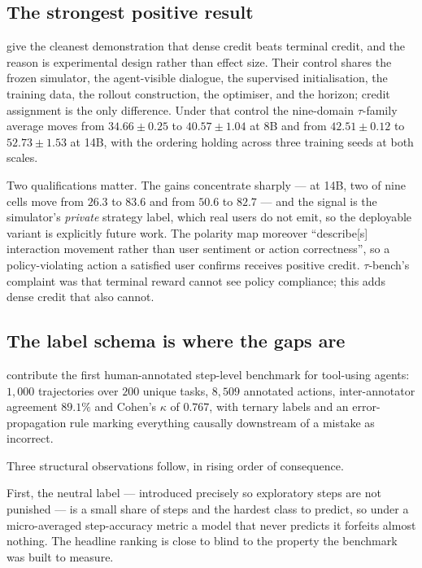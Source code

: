 \documentclass[10pt,twocolumn,a4paper]{article}
\begin{document}
\subsection{The strongest positive result}

\citet{zhao2026betteragentsmultiturnuser} give the cleanest demonstration that dense credit
beats terminal credit, and the reason is experimental design rather than effect size.
Their control shares the frozen simulator, the agent-visible dialogue, the supervised
initialisation, the training data, the rollout construction, the optimiser, and the
horizon; credit assignment is the only difference.
Under that control the nine-domain $\tau$-family average moves from
$34.66 \pm 0.25$ to $40.57 \pm 1.04$ at 8B and from $42.51 \pm 0.12$ to
$52.73 \pm 1.53$ at 14B, with the ordering holding across three training seeds at both
scales.

Two qualifications matter.
The gains concentrate sharply --- at 14B, two of nine cells move from $26.3$ to $83.6$ and
from $50.6$ to $82.7$ --- and the signal is the simulator's \emph{private} strategy label,
which real users do not emit, so the deployable variant is explicitly future work.
The polarity map moreover ``describe[s] interaction movement rather than user sentiment or
action correctness'', so a policy-violating action a satisfied user confirms receives
positive credit.
$\tau$-bench's complaint was that terminal reward cannot see policy compliance; this adds
dense credit that also cannot.

\subsection{The label schema is where the gaps are}

\citet{fan2026agentprocessbenchdiagnosingsteplevelprocess} contribute the first
human-annotated step-level benchmark for tool-using agents: $1{,}000$ trajectories over
$200$ unique tasks, $8{,}509$ annotated actions, inter-annotator agreement $89.1\%$ and
Cohen's $\kappa$ of $0.767$, with ternary labels and an error-propagation rule marking
everything causally downstream of a mistake as incorrect.

Three structural observations follow, in rising order of consequence.

First, the neutral label --- introduced precisely so exploratory steps are not punished ---
is a small share of steps and the hardest class to predict, so under a micro-averaged
step-accuracy metric a model that never predicts it forfeits almost nothing.
The headline ranking is close to blind to the property the benchmark was built to measure.
\end{document}
